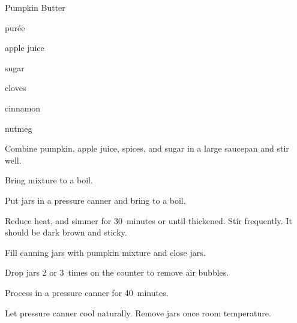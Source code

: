 \begin{recipe}{Pumpkin Butter}{}{}

\begin{ingredients}
\item \C{3\threequarter}  purée
\item \C{\threequarter} apple juice
\item \C{1\half} sugar
\item {} 
\item \tp{\half} cloves
\item {} cinnamon
\item {} nutmeg
\end{ingredients}

\begin{directions}
\item Combine pumpkin, apple juice, spices, and sugar in a large saucepan and stir well.
\item Bring mixture to a boil.
\item Put jars in a pressure canner and bring to a boil.
\item Reduce heat, and simmer for 30~minutes or until thickened. Stir frequently. It should be dark brown and sticky.
\item Fill canning jars with pumpkin mixture and close jars.
\item Drop jars 2 or 3~times on the counter to remove air bubbles.
\item Process in a pressure canner for 40~minutes.
\item Let pressure canner cool naturally. Remove jars once room temperature.
\end{directions}

\end{recipe}
